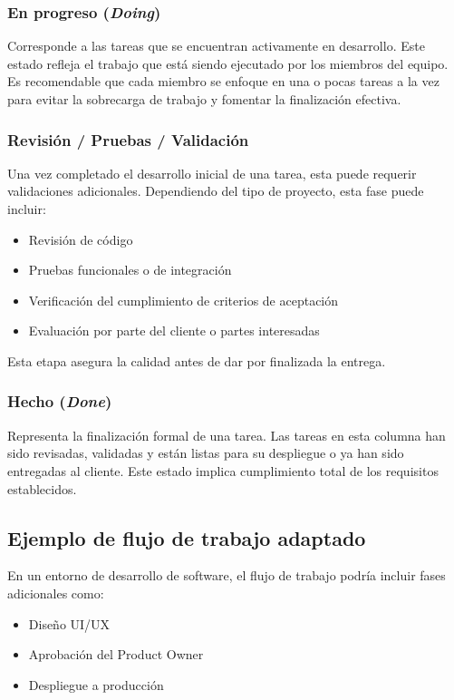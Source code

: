 \subsubsection{En progreso (\textit{Doing})}

Corresponde a las tareas que se encuentran activamente en desarrollo. Este estado refleja el trabajo que está siendo ejecutado por los miembros del equipo. Es recomendable que cada miembro se enfoque en una o pocas tareas a la vez para evitar la sobrecarga de trabajo y fomentar la finalización efectiva.

\subsubsection{Revisión / Pruebas / Validación}

Una vez completado el desarrollo inicial de una tarea, esta puede requerir validaciones adicionales. Dependiendo del tipo de proyecto, esta fase puede incluir:
\begin{itemize}
    \item Revisión de código
    \item Pruebas funcionales o de integración
    \item Verificación del cumplimiento de criterios de aceptación
    \item Evaluación por parte del cliente o partes interesadas
\end{itemize}

Esta etapa asegura la calidad antes de dar por finalizada la entrega.

\subsubsection{Hecho (\textit{Done})}

Representa la finalización formal de una tarea. Las tareas en esta columna han sido revisadas, validadas y están listas para su despliegue o ya han sido entregadas al cliente. Este estado implica cumplimiento total de los requisitos establecidos.

\subsection{Ejemplo de flujo de trabajo adaptado}

En un entorno de desarrollo de software, el flujo de trabajo podría incluir fases adicionales como:
\begin{itemize}
    \item Diseño UI/UX
    \item Aprobación del Product Owner
    \item Despliegue a producción
\end{itemize}

